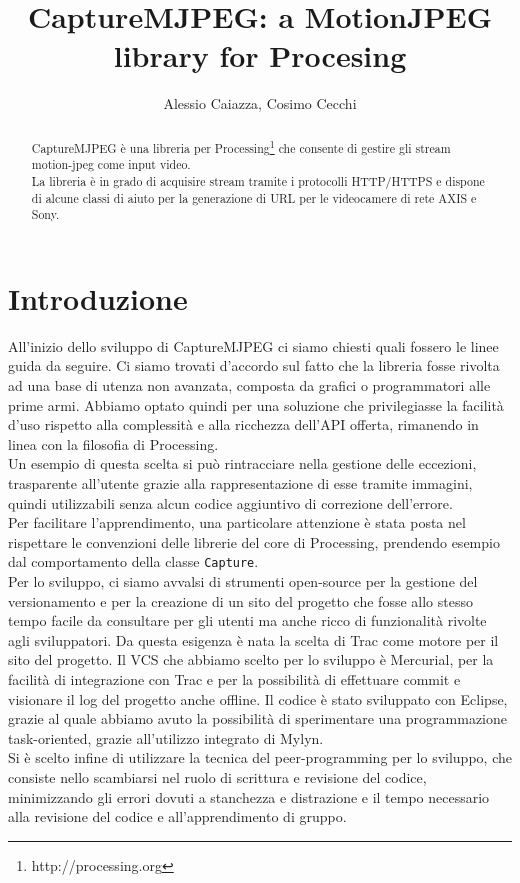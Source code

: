 \documentclass[a4paper,11pt]{article}
\author{Alessio Caiazza, Cosimo Cecchi}
\title{CaptureMJPEG: a MotionJPEG library for Procesing}
\begin{document}
\maketitle

\newcommand{\reffigura}[1]{
  Figura \ref{#1}
}

\begin{abstract}
CaptureMJPEG è una libreria per
Processing\footnote{http://processing.org} che consente di gestire gli
stream motion-jpeg come input video.\\
La libreria è in grado di acquisire stream tramite i protocolli
\mbox{HTTP/HTTPS} e dispone di alcune classi di aiuto per la 
generazione di URL per le videocamere di rete AXIS e Sony.  
\end{abstract}
\tableofcontents


\section{Introduzione}
\label{sec:introduzione}
All'inizio dello sviluppo di CaptureMJPEG ci siamo chiesti quali
fossero le linee guida da seguire. Ci siamo trovati d'accordo sul
fatto che la libreria fosse rivolta ad una base di utenza non
avanzata, composta da grafici o programmatori alle prime armi. Abbiamo
optato quindi per una soluzione che privilegiasse la facilit\`a d'uso
rispetto alla complessit\`a e alla ricchezza dell'API offerta,
rimanendo in linea con la filosofia di Processing.\\
Un esempio di questa scelta si pu\`o rintracciare nella gestione delle
eccezioni, trasparente all'utente grazie alla rappresentazione di esse
tramite immagini, quindi utilizzabili senza alcun codice aggiuntivo di
correzione dell'errore.\\
Per facilitare l'apprendimento, una particolare attenzione \`e stata
posta nel rispettare le convenzioni delle librerie del core di
Processing, prendendo esempio dal comportamento della classe
\texttt{Capture}.\\
Per lo sviluppo, ci siamo avvalsi di strumenti open-source per la
gestione del versionamento e per la creazione di un sito del progetto
che fosse allo stesso tempo facile da consultare per gli utenti ma
anche ricco di funzionalit\`a rivolte agli sviluppatori. Da questa
esigenza \`e nata la scelta di Trac come motore per il sito del
progetto. Il VCS che abbiamo scelto per lo sviluppo \`e Mercurial, per
la facilit\`a di integrazione con Trac e per la possibilit\`a di
effettuare commit e visionare il log del progetto anche offline. Il
codice \`e stato sviluppato con Eclipse, grazie al quale abbiamo avuto
la possibilit\`a di sperimentare una programmazione task-oriented,
grazie all'utilizzo integrato di Mylyn.\\
Si \`e scelto infine di utilizzare la tecnica del peer-programming per
lo sviluppo, che consiste nello scambiarsi nel ruolo di scrittura e
revisione del codice, minimizzando gli errori dovuti a stanchezza e
distrazione e il tempo necessario alla revisione del codice e
all'apprendimento di gruppo.
\end{document}

